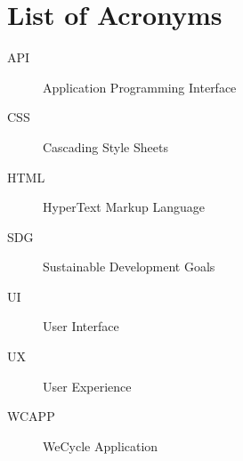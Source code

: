 \chapter*{List of Acronyms}
\begin{description}
    \item[API] Application Programming Interface
    \item[CSS] Cascading Style Sheets
    \item[HTML] HyperText Markup Language
    \item[SDG] Sustainable Development Goals
    \item[UI] User Interface
    \item[UX] User Experience
    \item[WCAPP] WeCycle Application
\end{description}
